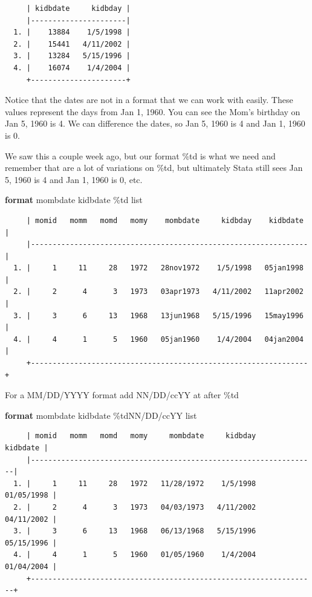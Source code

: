 \documentclass[
]{book}
\newenvironment{Shaded}{\begin{snugshade}}{\end{snugshade}}
\newcommand{\KeywordTok}[1]{\textcolor[rgb]{0.13,0.29,0.53}{\textbf{#1}}}
\newcommand{\NormalTok}[1]{#1}
\newcommand{\OtherTok}[1]{\textcolor[rgb]{0.56,0.35,0.01}{#1}}
\begin{document}
\begin{verbatim}
     | kidbdate     kidbday |
     |----------------------|
  1. |    13884    1/5/1998 |
  2. |    15441   4/11/2002 |
  3. |    13284   5/15/1996 |
  4. |    16074    1/4/2004 |
     +----------------------+
\end{verbatim}

Notice that the dates are not in a format that we can work with easily. These values represent the days from Jan 1, 1960. You can see the Mom's birthday on Jan 5, 1960 is 4. We can difference the dates, so Jan 5, 1960 is 4 and Jan 1, 1960 is 0.

We saw this a couple week ago, but our format \%td is what we need and remember that are a lot of variations on \%td, but ultimately Stata still sees Jan 5, 1960 is 4 and Jan 1, 1960 is 0, etc.

\begin{Shaded}
\begin{Highlighting}[]
\KeywordTok{format}\NormalTok{ mombdate kidbdate \%td}
\OtherTok{list}
\end{Highlighting}
\end{Shaded}

\begin{verbatim}
     | momid   momm   momd   momy    mombdate     kidbday    kidbdate |
     |----------------------------------------------------------------|
  1. |     1     11     28   1972   28nov1972    1/5/1998   05jan1998 |
  2. |     2      4      3   1973   03apr1973   4/11/2002   11apr2002 |
  3. |     3      6     13   1968   13jun1968   5/15/1996   15may1996 |
  4. |     4      1      5   1960   05jan1960    1/4/2004   04jan2004 |
     +----------------------------------------------------------------+
\end{verbatim}

For a MM/DD/YYYY format add NN/DD/ccYY at after \%td

\begin{Shaded}
\begin{Highlighting}[]
\KeywordTok{format}\NormalTok{ mombdate kidbdate \%tdNN/DD/ccYY}
\OtherTok{list}
\end{Highlighting}
\end{Shaded}

\begin{verbatim}
     | momid   momm   momd   momy     mombdate     kidbday     kidbdate |
     |------------------------------------------------------------------|
  1. |     1     11     28   1972   11/28/1972    1/5/1998   01/05/1998 |
  2. |     2      4      3   1973   04/03/1973   4/11/2002   04/11/2002 |
  3. |     3      6     13   1968   06/13/1968   5/15/1996   05/15/1996 |
  4. |     4      1      5   1960   01/05/1960    1/4/2004   01/04/2004 |
     +------------------------------------------------------------------+
\end{verbatim}
\end{document}
